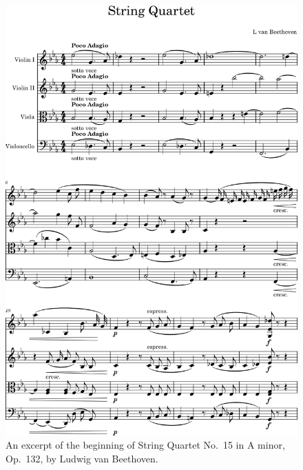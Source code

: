 \documentclass[aps,pra,10pt,twocolumn]{revtex4-2}
\begin{document}
\begin{figure}[h]
    \centering
    \includegraphics[width=\linewidth]{../Trials/1_excerpt.png}
    \caption{An excerpt of the beginning of String Quartet No.\ 15 in A minor, Op.\ 132, by Ludwig van Beethoven.}
    \label{fig:excerpt}
\end{figure}
\end{document}
